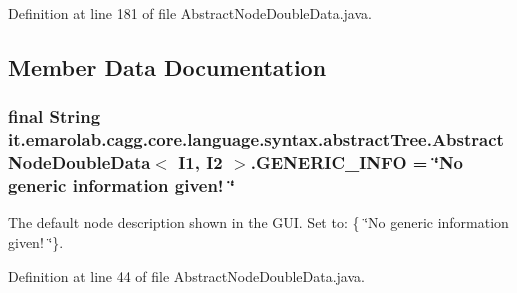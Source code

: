 Definition at line 181 of file Abstract\-Node\-Double\-Data.\-java.



\subsection{Member Data Documentation}
\hypertarget{classit_1_1emarolab_1_1cagg_1_1core_1_1language_1_1syntax_1_1abstractTree_1_1AbstractNodeDoubleData_3_01I1_00_01I2_01_4_a7abbd84bcdf4a8fec6062304885b93e2}{
\subsubsection[{G\-E\-N\-E\-R\-I\-C\-\_\-\-I\-N\-F\-O}]{\setlength{\rightskip}{0pt plus 5cm}final String it.\-emarolab.\-cagg.\-core.\-language.\-syntax.\-abstract\-Tree.\-Abstract\-Node\-Double\-Data$<$ I1, I2 $>$.G\-E\-N\-E\-R\-I\-C\-\_\-\-I\-N\-F\-O = \char`\"{}No generic information given! \char`\"{}\hspace{0.3cm}{\ttfamily [static]}}}\label{classit_1_1emarolab_1_1cagg_1_1core_1_1language_1_1syntax_1_1abstractTree_1_1AbstractNodeDoubleData_3_01I1_00_01I2_01_4_a7abbd84bcdf4a8fec6062304885b93e2}
The default node description shown in the G\-U\-I. Set to\-: \{ \char`\"{}\-No generic information given! \char`\"{}\}. 

Definition at line 44 of file Abstract\-Node\-Double\-Data.\-java.

